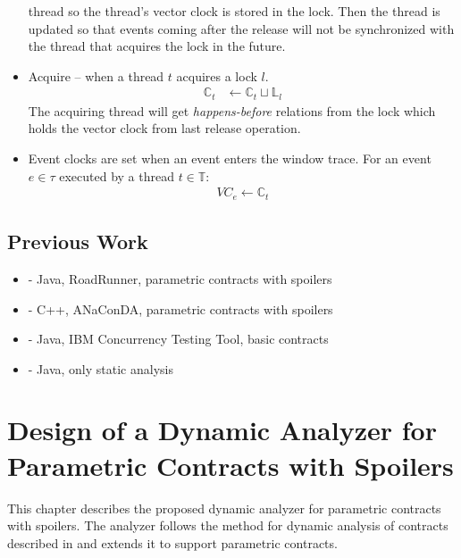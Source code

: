 \begin{itemize}
        thread so the thread's vector clock is stored in the lock. Then the
        thread is updated so that events coming after the release will not be
        synchronized with the thread that acquires the lock in the future.
    \item Acquire -- when a thread $t$ acquires a lock $l$.
        \begin{align*}
            \mathbb{C}_t &\leftarrow \mathbb{C}_t \sqcup \mathbb{L}_l
        \end{align*}
        The acquiring thread will get \emph{happens-before} relations from the
        lock which holds the vector clock from last release operation.
    \item Event clocks are set when an event enters the window trace. For an
        event $e \in \tau$ executed by a thread $t \in \mathbb{T}$:
        \begin{align*}
            VC_e \leftarrow \mathbb{C}_t
        \end{align*}
\end{itemize}


\section{Previous Work}


\begin{itemize}
    \item \cite{janousek} - Java, RoadRunner, parametric contracts with spoilers
    \item \cite{contracts} - C++, ANaConDA, parametric contracts with spoilers
    \item \cite{FITPUB10817} - Java, IBM Concurrency Testing Tool, basic
        contracts
    \item \cite{DBLP:journals/corr/SousaDFL15} - Java, only static analysis
\end{itemize}



\chapter{Design of a Dynamic Analyzer for Parametric Contracts with Spoilers}
\label{chFour}

This chapter describes the proposed dynamic analyzer for parametric contracts
with spoilers. The analyzer follows the method for dynamic analysis of contracts
described in \cite{contracts} and extends it to support parametric contracts.

